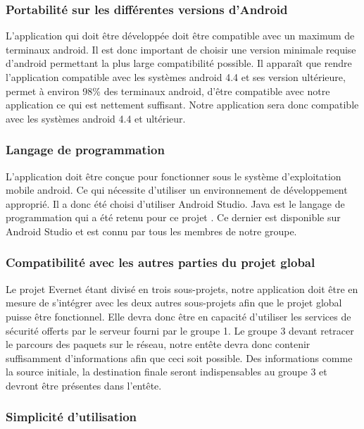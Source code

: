 \documentclass[a4paper, 12pt]{article}
\begin{document}
        \subsubsection{Portabilité sur les différentes versions d'Android}
            L'application qui doit être développée doit être compatible avec un maximum de terminaux android. Il est donc important de choisir une version minimale requise d'android permettant la plus large compatibilité possible. Il apparaît que rendre l'application compatible avec les systèmes android 4.4 et ses version ultérieure, permet à environ 98\%
            des terminaux android, d'être compatible avec notre application ce qui est nettement suffisant. Notre application sera donc compatible avec les systèmes android 4.4 et ultérieur.
        
        \subsubsection{Langage de programmation}
            L'application doit être conçue pour fonctionner sous le système d'exploitation mobile android. Ce qui nécessite d'utiliser un environnement de développement approprié.
            Il a donc été choisi d'utiliser Android Studio. Java est le langage de programmation qui a été retenu pour ce projet . Ce dernier est disponible sur Android Studio et est connu par tous les membres de notre groupe.
        
        \subsubsection{Compatibilité avec les autres parties du projet global}
            Le projet Evernet étant divisé en trois sous-projets, notre application doit être en mesure de s'intégrer avec les deux autres sous-projets afin que le projet global puisse être fonctionnel. Elle devra donc être en capacité d'utiliser les services de sécurité offerts par le serveur fourni par le groupe 1. Le groupe 3 devant retracer le parcours des paquets sur le réseau, notre entête devra donc contenir suffisamment d'informations afin que ceci soit possible. Des informations comme la source initiale, la destination finale seront indispensables au groupe 3 et devront être présentes dans l'entête.  
        
        \subsubsection{Simplicité d'utilisation}
            
\end{document}
